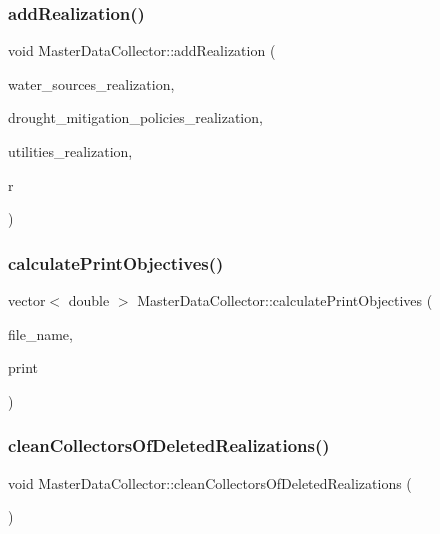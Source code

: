 \subsubsection{\texorpdfstring{add\+Realization()}{addRealization()}}
{\footnotesize\ttfamily void Master\+Data\+Collector\+::add\+Realization (\begin{DoxyParamCaption}\item[{vector$<$ \mbox{\hyperlink{classWaterSource}{Water\+Source}} $\ast$$>$}]{water\+\_\+sources\+\_\+realization,  }\item[{vector$<$ \mbox{\hyperlink{classDroughtMitigationPolicy}{Drought\+Mitigation\+Policy}} $\ast$$>$}]{drought\+\_\+mitigation\+\_\+policies\+\_\+realization,  }\item[{vector$<$ \mbox{\hyperlink{classUtility}{Utility}} $\ast$$>$}]{utilities\+\_\+realization,  }\item[{unsigned long}]{r }\end{DoxyParamCaption})}

\mbox{\label{classMasterDataCollector_a30c5c81c8c2ccb475ce2ccbb2ae07608}} 
\subsubsection{\texorpdfstring{calculate\+Print\+Objectives()}{calculatePrintObjectives()}}
{\footnotesize\ttfamily vector$<$ double $>$ Master\+Data\+Collector\+::calculate\+Print\+Objectives (\begin{DoxyParamCaption}\item[{string}]{file\+\_\+name,  }\item[{bool}]{print }\end{DoxyParamCaption})}

\mbox{\label{classMasterDataCollector_a92683f7c5ec82e45259fe403be285149}} 
\subsubsection{\texorpdfstring{clean\+Collectors\+Of\+Deleted\+Realizations()}{cleanCollectorsOfDeletedRealizations()}}
{\footnotesize\ttfamily void Master\+Data\+Collector\+::clean\+Collectors\+Of\+Deleted\+Realizations (\begin{DoxyParamCaption}{ }\end{DoxyParamCaption})}

